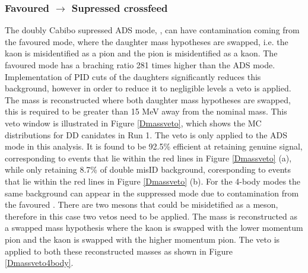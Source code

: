 \subsubsection{Favoured $\to$ Supressed crossfeed}
\label{sec:backgrounds:crossfeed}

The doubly Cabibo supressed ADS mode, \decay{\Bm}{\D(\Kp\pim)\Kstarm}, can have contamination coming from the favoured \decay{\Bm}{\D(\Km\pip)\Kstarm} mode, where the daughter mass hypotheses are swapped, i.e. the kaon is misidentified as a pion and the pion is misidentified as a kaon. The favoured mode has a braching ratio 281 times higher than the ADS mode. Implementation of PID cuts of the \D daughters significantly reduces this background, however in order to reduce it to negligible levels a veto is applied. The \Dz mass is reconstructed where both daughter mass hypotheses are swapped, this is required to be greater than 15 MeV away from the nominal \Dz mass. This veto window is illustrated in Figure \ref{Dmassveto}, which shows the MC distributions for DD canidates in Run 1. The veto is only applied to the ADS mode in this analysis. It is found to be 92.5\% efficient at retaining genuine signal, corresponding to events that lie within the red lines in Figure \ref{Dmassveto} (a), while only retaining 8.7\% of double misID background, coresponding to events that lie within the red lines in Figure \ref{Dmassveto} (b). For the 4-body modes the same background can appear in the suppressed \decay{\Bm}{\D(\Kp\pim\pip\pim)\Kstarm} mode due to contamination from the favoured \decay{\Bm}{\D(\Km\pip\pim\pip)\Kstarm}. There are two \pip mesons that could be misidetified as a \Kp meson, therefore in this case two vetos need to be applied. The \Dz mass is reconstructed as a swapped mass hypothesis where the kaon is swapped with the lower momentum pion and the kaon is swapped with the higher momentum pion. The veto is applied to both these reconstructed masses as shown in Figure \ref{Dmassveto4body}.

